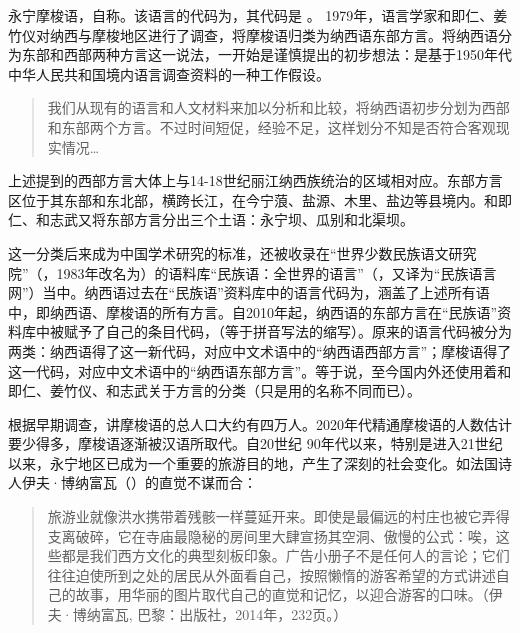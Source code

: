 永宁摩梭语，自称。该语言的代码为\parencite{lewisetal2016}，其代码是 \parencite{Nordhoff2012}。
1979年，语言学家和即仁、姜竹仪对纳西与摩梭地区进行了调查，将摩梭语归类为纳西语东部方言\parencite[4, 104--116]{heetal1985}。将{纳西语}分为东部和西部两种方言这一说法，一开始是谨慎提出的初步想法：是基于1950年代中华人民共和国境内语言调查资料的一种工作假设。

\begin{quotation}
我们从现有的语言和人文材料来加以分析和比较，将纳西语初步分划为西部和东部两个{方言}。不过时间短促，经验不足，这样划分不知是否符合客观现实情况{\dots}\parencite[120]{heetal1988}
\end{quotation}

{\noindent}上述提到的西部{方言}大体上与14-18世纪丽江纳西族统治的区域相对应。东部{方言}区位于其东部和东北部，横跨长江，在今宁蒗、盐源、木里、盐边等县境内。和即仁、和志武又将东部{方言}分出三个土语：永宁坝、瓜别和北渠坝。

这一分类后来成为中国学术研究的标准，还被收录在“世界少数民族语文研究院”（，1983年改名为）的语料库“民族语：全世界的语言”（，又译为“民族语言网”）当中\parencite{gordon2005}。{纳西}语过去在“民族语”资料库中的语言代码为，涵盖了上述所有语中，即纳西语、摩梭语的所有{方言}。自2010年起，{纳西}语的东部{方言}在“民族语”资料库中被赋予了自己的条目代码，（等于拼音写法的缩写）。原来的语言代码被分为两类：{纳西}语得了这一新代码，对应中文术语中的“{纳西}语西部{方言}”；摩梭语得了这一代码，对应中文术语中的“{纳西}语东部{方言}”。等于说，至今国内外还使用着和即仁、姜竹仪、和志武关于方言的分类（只是用的名称不同而已）。

根据早期调查，讲摩梭语的总人口大约有四万人\parencite[107]{heetal1985}。2020年代精通摩梭语的人数估计要少得多，摩梭语逐渐被汉语所取代。自20世纪 90年代以来，特别是进入21世纪以来，永宁地区已成为一个重要的旅游目的地，产生了深刻的社会变化\parencite{milan_tourisme_2019}。如法国诗人伊夫·博纳富瓦（）的直觉不谋而合：

\begin{quote}
    旅游业就像洪水携带着残骸一样蔓延开来。即使是最偏远的村庄也被它弄得支离破碎，它在寺庙最隐秘的房间里大肆宣扬其空洞、傲慢的公式：唉，这些都是我们西方文化的典型刻板印象。广告小册子不是任何人的言论；它们往往迫使所到之处的居民从外面看自己，按照懒惰的游客希望的方式讲述自己的故事，用华丽的图片取代自己的直觉和记忆，以迎合游客的口味。（伊夫·博纳富瓦,  巴黎：出版社，2014年，232页。）
\end{quote}

